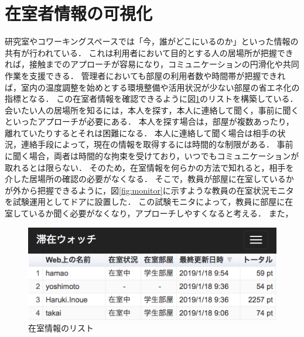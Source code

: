 \section{在室者情報の可視化}\label{3.2}
研究室やコワーキングスペースでは「今，誰がどこにいるのか」といった情報の共有が行われている．
これは利用者において目的とする人の居場所が把握できれば，接触までのアプローチが容易になり，コミュニケーションの円滑化や共同作業を支援できる．
管理者においても部屋の利用者数や時間帯が把握できれば，室内の温度調整を始めとする環境整備や活用状況が少ない部屋の省エネ化の指標となる．
この在室者情報を確認できるように図\ref{fig:list}のリストを構築している．
会いたい人の居場所を知るには，本人を探す，本人に連絡して聞く，事前に聞くといったアプローチが必要にある．
本人を探す場合は，部屋が複数あったり，離れていたりするとそれは困難になる．
本人に連絡して聞く場合は相手の状況，連絡手段によって，現在の情報を取得するには時間的な制限がある．
事前に聞く場合，両者は時間的な拘束を受けており，いつでもコミュニケーションが取れるとは限らない．
そのため，在室情報を何らかの方法で知れると，相手を介した居場所の確認の必要がなくなる．
そこで，教員が部屋に在室しているかが外から把握できるように，図\ref{fig:monitor}に示すような教員の在室状況モニタを試験運用としてドアに設置した．
この試験モニタによって，教員に部屋に在室しているか聞く必要がなくなり，アプローチしやすくなると考える．
また，


\begin{figure}[H]
  \begin{center}
    \includegraphics[width=150mm]{image/ListOccupancy.png}
    \caption{在室情報のリスト}
    \label{fig:list}
  \end{center}
\end{figure}

